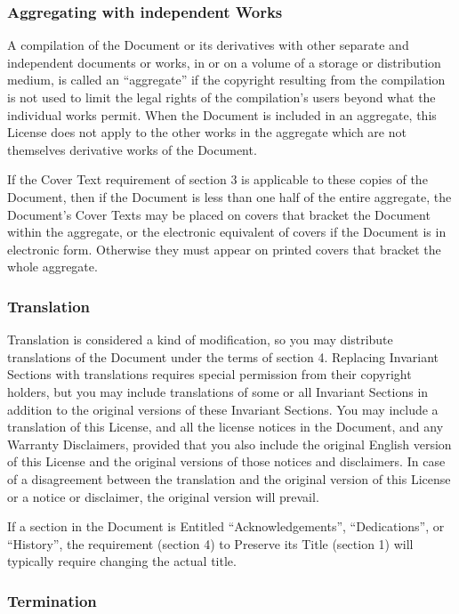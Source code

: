 \subsubsection{Aggregating with independent Works}

A compilation of the Document or its derivatives with other separate and independent documents or works, in or on a volume of a storage or distribution medium, is called an ``aggregate'' if the copyright resulting from the compilation is not used to limit the legal rights of the compilation's users beyond what the individual works permit. When the Document is included in an aggregate, this License does not apply to the other works in the aggregate which are not themselves derivative works of the Document.

If the Cover Text requirement of section 3 is applicable to these copies of the Document, then if the Document is less than one half of the entire aggregate, the Document's Cover Texts may be placed on covers that bracket the Document within the aggregate, or the electronic equivalent of covers if the Document is in electronic form. Otherwise they must appear on printed covers that bracket the whole aggregate.

\subsubsection{Translation}

Translation is considered a kind of modification, so you may distribute translations of the Document under the terms of section 4. Replacing Invariant Sections with translations requires special permission from their copyright holders, but you may include translations of some or all Invariant Sections in addition to the original versions of these Invariant Sections. You may include a translation of this License, and all the license notices in the Document, and any Warranty Disclaimers, provided that you also include the original English version of this License and the original versions of those notices and disclaimers. In case of a disagreement between the translation and the original version of this License or a notice or disclaimer, the original version will prevail.

If a section in the Document is Entitled ``Acknowledgements'', ``Dedications'', or ``History'', the requirement (section 4) to Preserve its Title (section 1) will typically require changing the actual title.

\subsubsection{Termination}


